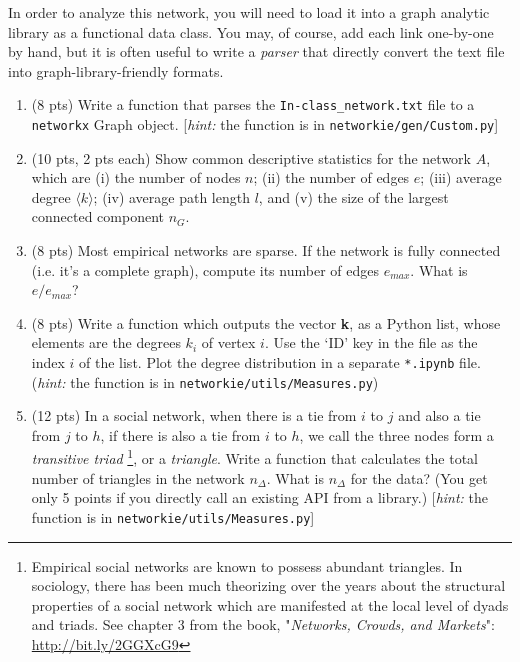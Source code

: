 \documentclass[10pt]{article}
\begin{document}
\begin{enumerate}
{	In order to analyze this network, you will need to load it into a graph analytic library as a functional data class. You may, of course, add each link one-by-one by hand, but it is often useful to write a {\it parser} that directly convert the text file into graph-library-friendly formats.
	\begin{enumerate}
		\item{(8 pts) Write a function that parses the \texttt{In-class\_network.txt} file to a \texttt{networkx} Graph object.} [{\it hint:} the function is in \texttt{networkie/gen/Custom.py}]
		\item{(10 pts, 2 pts each) Show common descriptive statistics for the network $A$, which are (i) the number of nodes $n$; (ii) the number of edges $e$; (iii) average degree $\langle k \rangle$; (iv) average path length $l$, and (v) the size of the largest connected component $n_G$.}
		\item{(8 pts) Most empirical networks are sparse. If the network is fully connected (i.e. it's a complete graph), compute its number of edges $e_{max}$. What is $e/e_{max}$?}
		\item{(8 pts) Write a function which outputs the vector \textbf{k}, as a Python list, whose elements are the degrees $k_i$ of vertex $i$. Use the `ID' key in the file as the index $i$ of the list. Plot the degree distribution in a separate \texttt{*.ipynb} file.} ({\it hint:} the function is in \texttt{networkie/utils/Measures.py})
		\item{(12 pts) In a social network, when there is a tie from $i$ to $j$ and also a tie from $j$ to $h$, if there is also a tie from $i$ to $h$, we call the three nodes form a {\it transitive triad} \footnote[1]{Empirical social networks are known to possess abundant triangles. In sociology, there has been much theorizing over the years about the structural properties of a social network which are manifested at the local level of dyads and triads. See chapter 3 from the book, "{\it Networks, Crowds, and Markets}": \url{http://bit.ly/2GGXcG9}}, or a {\it triangle}. Write a function that calculates the total number of triangles in the network $n_\Delta$. What is $n_\Delta$ for the data? (You get only 5 points if you directly call an existing API from a library.) [{\it hint:} the function is in \texttt{networkie/utils/Measures.py}]}

\end{enumerate}}
\end{enumerate}
\end{document}
